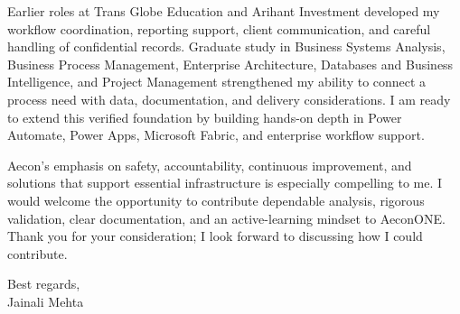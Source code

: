 \documentclass[letterpaper,11pt]{article}
\begin{document}
\bigbreak
Earlier roles at Trans Globe Education and Arihant Investment developed my workflow coordination, reporting support, client communication, and careful handling of confidential records. Graduate study in Business Systems Analysis, Business Process Management, Enterprise Architecture, Databases and Business Intelligence, and Project Management strengthened my ability to connect a process need with data, documentation, and delivery considerations. I am ready to extend this verified foundation by building hands-on depth in Power Automate, Power Apps, Microsoft Fabric, and enterprise workflow support.

\bigbreak
Aecon's emphasis on safety, accountability, continuous improvement, and solutions that support essential infrastructure is especially compelling to me. I would welcome the opportunity to contribute dependable analysis, rigorous validation, clear documentation, and an active-learning mindset to AeconONE. Thank you for your consideration; I look forward to discussing how I could contribute.

\bigbreak
Best regards,\\
Jainali Mehta
\end{document}
